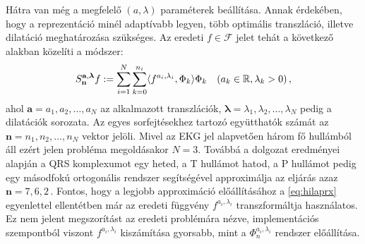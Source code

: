 \documentclass[oneside,titlepage,12pt,a4paper]{report}
\begin{document}
Hátra van még a megfelelő $(a,\lambda)$ paraméterek beállítása. Annak érdekében, hogy a reprezentáció minél adaptívabb legyen, több  optimális transzláció, illetve dilatáció meghatározása szükséges. Az eredeti $f\in\mathcal{F}$ jelet tehát a következő alakban közelíti a módszer:
\begin{equation*}
	S_{\mathbf{n}}^{\mathbf{a},\boldsymbol{\lambda}}f:=\sum_{i=1}^N\sum_{k=0}^{n_i} \langle f^{a_i,\lambda_i},\Phi_{k}\rangle\Phi_{k} \quad
	(a_k \in \Bbb R,\lambda_k>0)\,,
\end{equation*}
ahol $\mathbf{a}=a_1, a_2, \ldots, a_N$ az alkalmazott transzlációk, $\boldsymbol{\lambda}=\lambda_1, \lambda_2, \ldots, \lambda_N$ pedig a dilatációk sorozata. Az egyes sorfejtésekhez tartozó együtthatók számát az $\mathbf{n}=n_1, n_2, \ldots, n_N$ vektor jelöli. Mivel az EKG jel alapvetően három fő hullámból áll ezért jelen probléma megoldásakor $N=3.$ Továbbá a \cite{hexp3} dolgozat eredményei alapján
a QRS komplexumot egy heted, a T hullámot hatod, a P hullámot pedig egy másodfokú ortogonális rendszer segítségével approximálja az eljárás azaz $\mathbf{n}=7,6,2\,.$ Fontos, hogy a legjobb approximáció előállításához a \eqref{eq:hilaprx} egyenlettel ellentétben már az eredeti függvény $f^{a_i,\lambda_i}$ transzformáltja használatos. Ez nem jelent megszorítást az eredeti problémára nézve, implementációs szempontból viszont $f^{a_i,\lambda_i}$ kiszámítása gyorsabb, mint a $\Phi_n^{a_i,\lambda_i}$ rendszer előállítása.
\end{document}
